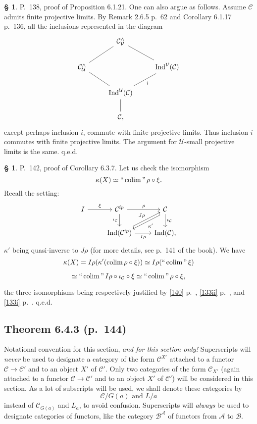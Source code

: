 \documentclass[12pt]{article}%
\theoremstyle{remark}
\theoremstyle{definition}
\newtheorem{s}[thm]{\S}%
\newcommand{\nn}{\noindent}
\newcommand{\A}{\mathcal A}
\newcommand{\B}{\mathcal B}
\newcommand{\C}{\mathcal C}
\newcommand{\U}{\mathcal U}
\newcommand{\V}{\mathcal V}
\DeclareMathOperator*{\colim}{colim}%
\DeclareMathOperator*{\ic}{``\colim"}
\DeclareMathOperator{\Ind}{Ind}
\begin{document}
%

\begin{s} 
P.~138, proof of Proposition 6.1.21. One can also argue as follows. Assume $\C$ admits finite projective limits. By Remark 2.6.5 p.~62 and Corollary 6.1.17 p.~136, all the inclusions represented in the diagram 
\[
\begin{tikzcd}
{}&\C^\wedge_\V\ar[-]{ld}\ar[-]{rd}\\
\C^\wedge_\U\ar[-]{rd}&&\Ind^\V(\C)\ar[-]{ld}{i}\\
&\Ind^\U(\C)\ar[-]{d}\\
&\C,
\end{tikzcd}
\]
except perhaps inclusion $i$, commute with finite projective limits. Thus inclusion $i$ commutes with finite projective limits. The argument for $\U$-small projective limits is the same. q.e.d.
\end{s}

%

\begin{s} P.~142, proof of Corollary 6.3.7. Let us check the isomorphism 
$$
\kappa(X)\simeq\ic\rho\circ\xi. 
$$ 
Recall the setting:
$$
\begin{tikzcd}
I\ar{r}{\xi}&\C^{\text fp}\ar{d}[swap]{\iota_\C}\ar{r}{\rho}&\C\ar[yshift=-.9ex]{dl}{\kappa'}\ar{d}{\iota_\C}\\ 
{}&\Ind(\C^{\text fp})\ar{ur}{J\rho}\ar{r}[swap]{I\rho}&\Ind(\C),
\end{tikzcd}
$$ 
$\kappa'$ being quasi-inverse to $J\rho$ (for more details, see p.~141 of the book). We have 
$$
\kappa(X)=I\rho(\kappa'(\colim\rho\circ\xi))\simeq I\rho(\ic\xi)
$$

$$
\simeq\ic I\rho\circ\iota_\C\circ\xi\simeq\ic\rho\circ\xi, 
$$ 

\nn the three isomorphisms being respectively justified by \eqref{140} p.~\pageref{140}, \eqref{133ii} p.~\pageref{133ii}, and \eqref{133i} p.~\pageref{133i}. q.e.d.
\end{s}


\subsection{Theorem 6.4.3 (p.~144)}

Notational convention for this section, {\em and for this section only!} Superscripts will {\em never} be used to designate a category of the form $\C^{X'}$ attached to a functor $\C\to\C'$ and to an object $X'$ of $\C'$. Only two categories of the form $\C_{X'}$ (again attached to a functor $\C\to\C'$ and to an object $X'$ of $\C'$) will be considered in this section. As a lot of subscripts will be used, we shall denote these categories by 
%
\begin{equation}\label{slice}
\C/G(a)\text{ and }L/a
\end{equation}
%
instead of $\C_{G(a)}$ and $L_a$, to avoid confusion. Superscripts will {\em always} be used to designate categories of functors, like the category $\B^\A$ of functors from $\A$ to $\B$. 
\end{document}
